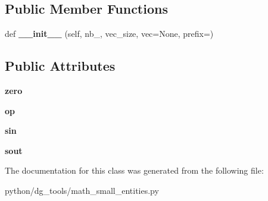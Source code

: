 \subsection*{Public Member Functions}
\begin{DoxyCompactItemize}
\item 
def {\bfseries \+\_\+\+\_\+init\+\_\+\+\_\+} (self, nb\+\_, vec\+\_\+size, vec=None, prefix=\textquotesingle{}\textquotesingle{})\hypertarget{classpython_1_1dg__tools_1_1math__small__entities_1_1StackZero_aeb0f7d55cd51fdf91bca4a05c8457d8b}{}\label{classpython_1_1dg__tools_1_1math__small__entities_1_1StackZero_aeb0f7d55cd51fdf91bca4a05c8457d8b}

\end{DoxyCompactItemize}
\subsection*{Public Attributes}
\begin{DoxyCompactItemize}
\item 
{\bfseries zero}\hypertarget{classpython_1_1dg__tools_1_1math__small__entities_1_1StackZero_afd77c3ead9b408cd92e28918c11a9430}{}\label{classpython_1_1dg__tools_1_1math__small__entities_1_1StackZero_afd77c3ead9b408cd92e28918c11a9430}

\item 
{\bfseries op}\hypertarget{classpython_1_1dg__tools_1_1math__small__entities_1_1StackZero_a0578f0f7b3b6767c71f1c6c64567bd93}{}\label{classpython_1_1dg__tools_1_1math__small__entities_1_1StackZero_a0578f0f7b3b6767c71f1c6c64567bd93}

\item 
{\bfseries sin}\hypertarget{classpython_1_1dg__tools_1_1math__small__entities_1_1StackZero_aeb83d2bb60478305de080dd215560dee}{}\label{classpython_1_1dg__tools_1_1math__small__entities_1_1StackZero_aeb83d2bb60478305de080dd215560dee}

\item 
{\bfseries sout}\hypertarget{classpython_1_1dg__tools_1_1math__small__entities_1_1StackZero_af808bd0b6e64b8aeba17cc160f29484b}{}\label{classpython_1_1dg__tools_1_1math__small__entities_1_1StackZero_af808bd0b6e64b8aeba17cc160f29484b}

\end{DoxyCompactItemize}


The documentation for this class was generated from the following file\+:\begin{DoxyCompactItemize}
\item 
python/dg\+\_\+tools/math\+\_\+small\+\_\+entities.\+py\end{DoxyCompactItemize}
